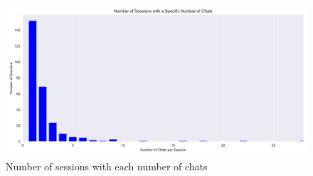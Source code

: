 \begin{figure}[H]
    \centering
    \includegraphics[width=\textwidth]{results/plots/assets/usage-12-number-of-sessions-with-number-of-chats.png}
    \caption{Number of sessions with each number of chats}
    \label{fig:usage_12_number_of_sessions_with_number_of_chats}
\end{figure}